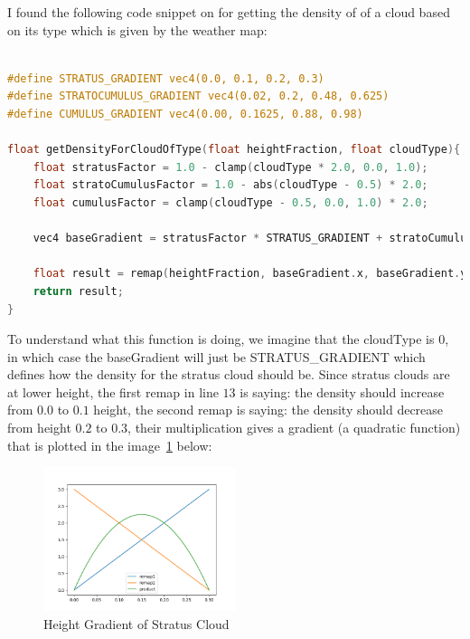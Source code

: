 I found the following code snippet on \cite{gamedevnet2015horizonzerodawn} for getting the density of of a cloud based on its type which is given by the weather map:
\begin{lstlisting}[language=C]

#define STRATUS_GRADIENT vec4(0.0, 0.1, 0.2, 0.3)
#define STRATOCUMULUS_GRADIENT vec4(0.02, 0.2, 0.48, 0.625)
#define CUMULUS_GRADIENT vec4(0.00, 0.1625, 0.88, 0.98)
    
float getDensityForCloudOfType(float heightFraction, float cloudType){
    float stratusFactor = 1.0 - clamp(cloudType * 2.0, 0.0, 1.0);
    float stratoCumulusFactor = 1.0 - abs(cloudType - 0.5) * 2.0;
    float cumulusFactor = clamp(cloudType - 0.5, 0.0, 1.0) * 2.0;

    vec4 baseGradient = stratusFactor * STRATUS_GRADIENT + stratoCumulusFactor * STRATOCUMULUS_GRADIENT + cumulusFactor * CUMULUS_GRADIENT;

    float result = remap(heightFraction, baseGradient.x, baseGradient.y, 0.0, 1.0) * remap(heightFraction, baseGradient.z, baseGradient.w, 1.0, 0.0);
    return result;
}

\end{lstlisting}

To understand what this function is doing, we imagine that the cloudType is $0$, in which case the baseGradient will just be STRATUS\_GRADIENT which defines how the density for the stratus cloud should be. Since stratus clouds are at lower height, the first remap in line $13$ is saying: the density should increase from $0.0$ to $0.1$ height, the second remap is saying: the density should decrease from height $0.2$ to $0.3$, their multiplication gives a gradient (a quadratic function) that is plotted in the image~\ref{fig:stratus_grad} below:
\begin{figure}[H]
    \centering
    \includegraphics[width=0.5\textwidth]{images/stratus_grad.png}
    \caption{Height Gradient of Stratus Cloud}
    \label{fig:stratus_grad}
\end{figure}

